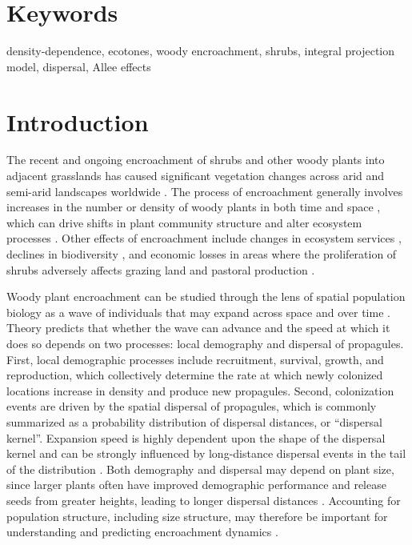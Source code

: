 \documentclass[11pt]{article}\usepackage[]{graphicx}\usepackage[usenames,dvipsnames]{xcolor}
\begin{document}
\section*{Keywords}

density-dependence, ecotones, woody encroachment, shrubs, integral projection model, dispersal, Allee effects

\newpage
\section*{Introduction}
The recent and ongoing encroachment of shrubs and other woody plants into adjacent grasslands has caused significant vegetation changes across arid and semi-arid landscapes worldwide \citep{van2000shrub, van2009causes, goslee2003high, gibbens2005vegetation,parizek2002soil, cabral2003shrub,trollope1989encroachment, roques2001dynamics}.
The process of encroachment generally involves increases in the number or density of woody plants in both time and space \citep{van2000shrub}, which can drive shifts in plant community structure and alter ecosystem processes \citep{schlesinger1990biological, ravi2009can,schlesinger1998plant, knapp2008shrub}.
Other effects of encroachment include changes in ecosystem services \citep{reed2015reorienting, kelleway2017review}, declines in biodiversity \citep{ratajczak2012woody, sirami2012changes, brandt2013regime}, and economic losses in areas where the proliferation of shrubs adversely affects grazing land and pastoral production \citep{morford2022herbaceous}.

Woody plant encroachment can be studied through the lens of spatial population biology as a wave of individuals that may expand across space and over time \citep{kot1996dispersal, neubert2000demography, wang2002integrodifference, pan2012invasion}.
Theory predicts that whether the wave can advance and the speed at which it does so depends on two processes: local demography and dispersal of propagules.
First, local demographic processes include recruitment, survival, growth, and reproduction, which collectively determine the rate at which newly colonized locations increase in density and produce new propagules. 
Second, colonization events are driven by the spatial dispersal of propagules, which is commonly summarized as a probability distribution of dispersal distances, or ``dispersal kernel''.
Expansion speed is highly dependent upon the shape of the dispersal kernel and can be strongly influenced by long-distance dispersal events in the tail of the distribution \citep{skarpaas2007dispersal}.
Both demography and dispersal may depend on plant size, since larger plants often have improved demographic performance and release seeds from greater heights, leading to longer dispersal distances \citep{nathan2011mechanistic}.
Accounting for population structure, including size structure, may therefore be important for understanding and predicting encroachment dynamics \citep{neubert2000demography}.
\end{document}
